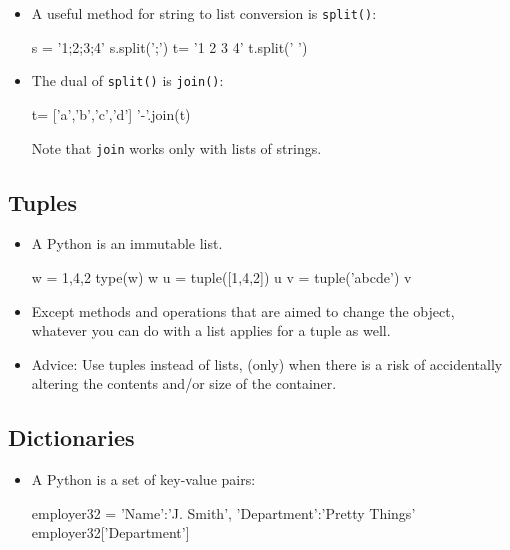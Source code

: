 \documentclass[a4paper]{article}
\begin{document}
\begin{itemize}
\item A useful method for string to list conversion is \Verb+split()+:

\begin{ucodeframe}
\begin{pyconsole}
s = '1;2;3;4'
s.split(';')
t= '1 2 3 4'
t.split(' ')
\end{pyconsole}
\end{ucodeframe}

\item The dual of \Verb+split()+ is \Verb+join()+:

\begin{ucodeframe}
\begin{pyconsole}
t= ['a','b','c','d']
'-'.join(t)
\end{pyconsole}
\end{ucodeframe}
Note that \Verb+join+ works only with lists of strings.
\end{itemize}

\subsection{Tuples}

\begin{itemize}
\item A Python  is an immutable list. 

\begin{ucodeframe}
\begin{pyconsole}
w = 1,4,2
type(w)
w
u = tuple([1,4,2])
u
v = tuple('abcde')
v
\end{pyconsole}
\end{ucodeframe}

\item Except methods and operations that are aimed to change the object,
whatever you can do with a list applies for a tuple as well. 

\item Advice: Use tuples instead of lists, (only) when there is a risk of accidentally
altering the contents and/or size of the container.
\end{itemize}

\subsection{Dictionaries}

\begin{itemize}
\item A Python  is a set of key-value pairs:

\begin{ucodeframe}
\begin{pyconsole}
employer32 = {'Name':'J. Smith', 'Department':'Pretty Things'}
employer32['Department']
\end{pyconsole}
\end{ucodeframe}

\end{itemize}
\end{document}
